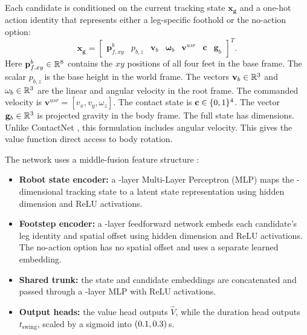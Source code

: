 Each candidate is conditioned on the current tracking state
$\mathbf{x_g}$ and a one-hot action identity that represents either a
leg-specific foothold or the no-action option:
\begin{equation}
  \mathbf{x_g} =
  \begin{bmatrix}
    \mathbf p_{f,xy}^{b} &
    p_{b,z} &
    \mathbf v_b &
    \mathbf \omega_b &
    \mathbf v^{usr} &
    \mathbf c &
    \mathbf g_b
  \end{bmatrix}^T .
  \label{eq:gaitnet-x}
\end{equation}
Here $\mathbf p_{f,xy}^{b} \in \mathbb{R}^{8}$ contains
the $xy$ positions of all four feet in the base frame. The scalar
$p_{b,z}$ is the base height in the world frame. The vectors
$\mathbf v_b \in \mathbb{R}^{3}$ and
$\mathbf \omega_b \in \mathbb{R}^{3}$ are the linear and
angular velocity in the root frame. The commanded velocity is
$\mathbf v^{usr} = [v_x, v_y, \omega_z]$. The contact state is
$\mathbf c \in \{0,1\}^{4}$. The vector
$\mathbf g_b \in \mathbb{R}^{3}$ is projected gravity in
the body frame. The full state has \corlStateDim{} dimensions. Unlike
ContactNet \cite{bratta_contactnet_2024}, this formulation includes
angular velocity. This gives the value function direct access to body
rotation.

The network uses a middle-fusion feature structure \cite{feng2021deep}:
\begin{itemize}
  \item \textbf{Robot state encoder:} a
    \numberstringnum{\corlStateEncoderLayers}-layer Multi-Layer
    Perceptron (MLP) maps the \corlStateDim-dimensional tracking state
    to a latent state representation using hidden dimension
    \corlStateEncoderHidden{} and ReLU activations.
  \item \textbf{Footstep encoder:} a
    \numberstringnum{\corlFootstepEncoderLayers}-layer feedforward
    network embeds each candidate's leg identity and spatial offset
    using hidden dimension \corlFootstepEncoderHidden{} and ReLU
    activations. The no-action option has no spatial offset and uses a
    separate learned embedding.
  \item \textbf{Shared trunk:} the state and candidate embeddings are
    concatenated and passed through a
    \numberstringnum{\corlTrunkLayers}-layer MLP with ReLU
    activations.
  \item \textbf{Output heads:} the value head outputs $\hat{V}$, while
    the duration head outputs $t_{\text{swing}}$, scaled by a sigmoid
    into $(0.1, 0.3)$\,s.
\end{itemize}


